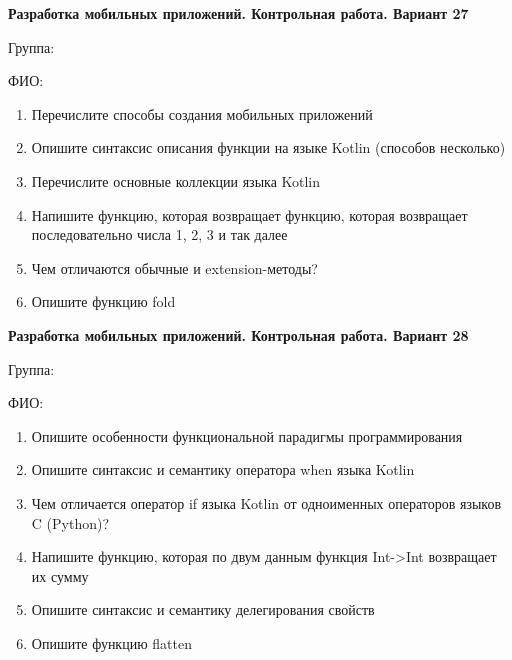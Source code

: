 \documentclass[12pt]{article}
\begin{document}
\newpage\begin{minipage}{\textwidth}
\textbf{Разработка мобильных приложений. Контрольная работа. Вариант 27}

Группа: \underline{\hspace{3cm}}

ФИО: \underline{\hspace{10cm}}

\begin{enumerate}
\item Перечислите способы создания мобильных приложений
\item Опишите синтаксис описания функции на языке Kotlin (способов несколько)
\item Перечислите основные коллекции языка Kotlin
\item Напишите функцию, которая возвращает функцию, которая возвращает последовательно числа 1, 2, 3 и так далее
\item Чем отличаются обычные и extension-методы?
\item Опишите функцию fold

\end{enumerate}
\end{minipage}

\newpage\begin{minipage}{\textwidth}
\textbf{Разработка мобильных приложений. Контрольная работа. Вариант 28}

Группа: \underline{\hspace{3cm}}

ФИО: \underline{\hspace{10cm}}

\begin{enumerate}
\item Опишите особенности функциональной парадигмы программирования
\item Опишите синтаксис и семантику оператора when языка Kotlin
\item Чем отличается оператор if языка Kotlin от одноименных операторов языков C (Python)?
\item Напишите функцию, которая по двум данным функция Int->Int возвращает их сумму
\item Опишите синтаксис и семантику делегирования свойств
\item Опишите функцию flatten

\end{enumerate}
\end{minipage}
\end{document}
